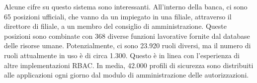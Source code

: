\singlespacing

Alcune cifre su questo sistema sono interessanti. All'interno della banca, ci sono 65 posizioni ufficiali, che vanno da un impiegato in una filiale, attraverso il direttore di filiale, a un membro del consiglio di amministrazione. Queste posizioni sono combinate con 368 diverse funzioni lavorative fornite dal database delle risorse umane. Potenzialmente, ci sono 23.920 ruoli diversi, ma il numero di ruoli attualmente in uso è di circa 1.300. Questo è in linea con l'esperienza di altre implementazioni RBAC. In media, 42.000 profili di sicurezza sono distribuiti alle applicazioni ogni giorno dal modulo di amministrazione delle autorizzazioni.














